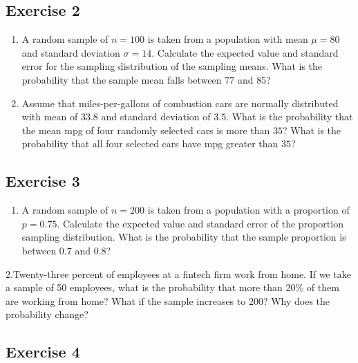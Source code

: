 \documentclass[
  letterpaper,
  DIV=11,
  numbers=noendperiod]{scrreprt}
\providecommand{\tightlist}{%
  \setlength{\itemsep}{0pt}\setlength{\parskip}{0pt}}\usepackage{longtable,booktabs,array}
\begin{document}
\hypertarget{exercise-2-20}{%
\subsection*{Exercise 2}\label{exercise-2-20}}

\begin{enumerate}
\def\labelenumi{\arabic{enumi}.}
\item
  A random sample of \(n=100\) is taken from a population with mean
  \(\mu=80\) and standard deviation \(\sigma=14\). Calculate the
  expected value and standard error for the sampling distribution of the
  sampling means. What is the probability that the sample mean falls
  between \(77\) and \(85\)?
\item
  Assume that miles-per-gallons of combustion cars are normally
  distributed with mean of \(33.8\) and standard deviation of \(3.5\).
  What is the probability that the mean mpg of four randomly selected
  cars is more than \(35\)? What is the probability that all four
  selected cars have mpg greater than \(35\)?
\end{enumerate}

\hypertarget{exercise-3-20}{%
\subsection*{Exercise 3}\label{exercise-3-20}}

\begin{enumerate}
\def\labelenumi{\arabic{enumi}.}
\tightlist
\item
  A random sample of \(n=200\) is taken from a population with a
  proportion of \(p=0.75\). Calculate the expected value and standard
  error of the proportion sampling distribution. What is the probability
  that the sample proportion is between \(0.7\) and \(0.8\)?
\end{enumerate}

2.Twenty-three percent of employees at a fintech firm work from home. If
we take a sample of 50 employees, what is the probability that more than
20\% of them are working from home? What if the sample increases to 200?
Why does the probability change?

\hypertarget{exercise-4-10}{%
\subsection*{Exercise 4}\label{exercise-4-10}}
\end{document}
